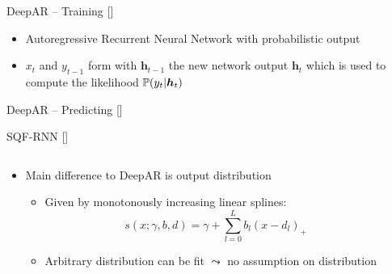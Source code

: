 \documentclass[10pt,aspectratio=169]{beamer}
\begin{document}
\begin{frame}[fragile]{DeepAR -- Training [\cite{Salinas2020}]}
    \begin{center}
        
    \end{center}
    \begin{itemize}
        \item Autoregressive Recurrent Neural Network with probabilistic output
        \item \(x_t\) and \(y_{t-1}\) form with \(\boldsymbol{h}_{t-1}\) the new network output \(\boldsymbol{h}_t\)
        which is used to compute the likelihood \(\P(y_t | \boldsymbol{h}_t)\)
    \end{itemize}
\end{frame}

\begin{frame}[fragile]{DeepAR -- Predicting [\cite{Salinas2020}]}
    \begin{center}
        
    \end{center}
    \begin{itemize}
    \end{itemize}
\end{frame}

\begin{frame}{SQF-RNN [\cite{Gasthaus2019}]}
    \begin{columns}
    \begin{column}{0.6\textwidth}
    \begin{itemize}
        \item Main difference to DeepAR is output distribution
        \begin{itemize}
            \item Given by monotonously increasing linear splines: 
            \[ s(x; \gamma, b, d) = \gamma + \sum_{l=0}^L b_l (x - d_l)_+ \]
            \item Arbitrary distribution can be fit \(\leadsto\) no assumption on distribution
        \end{itemize}
    \end{itemize}
    \end{column}

    \begin{column}{0.35\textwidth}
        
    \end{column}
    \end{columns}
\end{frame}
\end{document}
